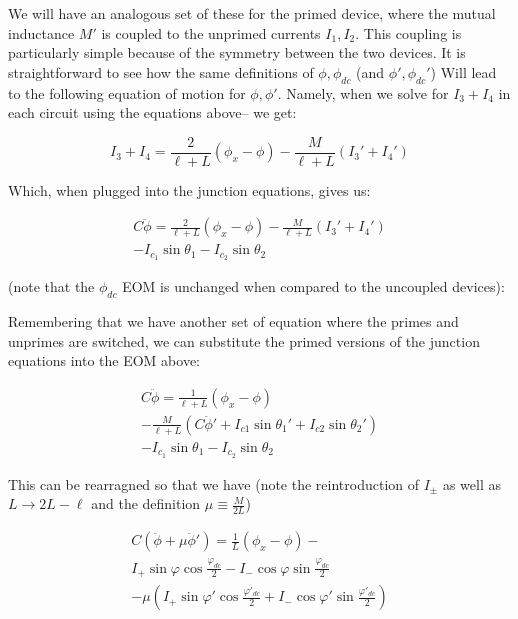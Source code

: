 \documentclass[paper=a4, twocolumn, fontsize=10pt]{article} %
\numberwithin{equation}{section} %
\numberwithin{figure}{section} %
\numberwithin{table}{section} %
\begin{document}
We will have an analogous set of these for the primed device, where the mutual inductance $M'$ is coupled to the unprimed currents $I_1, I_2$. This coupling is particularly simple because of the symmetry between the two devices. It is straightforward to see how the same definitions of $\phi,\phi_{dc}$ (and $\phi',\phi_{dc}'$) Will lead to the following equation of motion for $\phi,\phi'$. Namely, when we solve for $I_3+I_4$ in each circuit using the equations above-- we get:

\[ I_3 + I_4 = \frac{2}{\ell+L}\left(\phi_x - \phi \right) - \frac{M}{\ell+L} (I_3'+I_4') \]

Which, when plugged into the junction equations, gives us:

\begin{multline}
    C \ddot{\phi} = \frac{2}{\ell+L}\left( \phi_x - \phi \right) - \frac{M}{\ell+L} (I_3'+I_4') \\ - I_{c_1} \sin \theta_1 - I_{c_2} \sin \theta_2
\end{multline}

(note that the $\phi_{dc}$ EOM is unchanged when compared to the uncoupled devices):

Remembering that we have another set of equation where the primes and unprimes are switched, we can substitute the primed versions of the junction equations into the EOM above:

\begin{multline}
    C \ddot{\phi} = \frac{1}{\ell+L}\left( \phi_x - \phi \right) \\ - \frac{M}{\ell+L} ( C\ddot{\phi}' + I_{c1}\sin \theta_1' + I_{c2} \sin \theta_2') \\ - I_{c_1} \sin \theta_1 - I_{c_2} \sin \theta_2
\end{multline}

This can be rearragned so that we have (note the reintroduction of $I_{\pm}$ as well as $L\to 2L-\ell$ and the definition $\mu\equiv \frac{M}{2L}$)

\begin{multline}
    C \left(\ddot{\phi}+ \mu \ddot{\phi}' \right) = \frac{1}{L}\left( \phi_x - \phi \right) -  \\
    I_{+} \sin \varphi \cos \frac{\varphi_{dc}}{2} - I_{-} \cos \varphi \sin \frac{\varphi_{dc}}{2} \\
    - \mu ( I_{+} \sin \varphi' \cos \frac{\varphi'_{dc}}{2} + I_{-} \cos \varphi' \sin \frac{\varphi'_{dc}}{2})
\end{multline}
\end{document}
